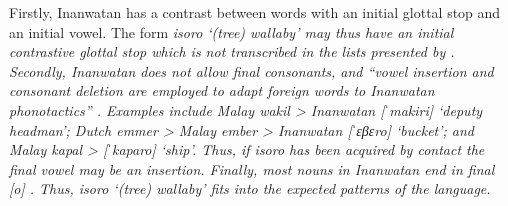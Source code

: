 Firstly, Inanwatan has a contrast between words with an initial
glottal stop and an initial vowel.
The form \it{isoro} ‘(tree) wallaby’ may thus have an initial
contrastive glottal stop which is not transcribed in the lists
presented by \citet[219, 229]{SmitsVoorhoeve1998}.
Secondly, Inanwatan does not allow final consonants,
and “vowel insertion and consonant deletion are employed to adapt
foreign words to Inanwatan phonotactics” \citep[6]{deVries2004}.
Examples include Malay \it{wakil} > Inanwatan [ˈmakiri] ‘deputy
headman’; Dutch \it{emmer} > Malay \it{ember} > Inanwatan [ˈɛβɛro]
‘bucket’; and Malay \it{kapal} > [ˈkaparo] ‘ship’.
Thus, if \it{isoro} has been acquired by contact the final vowel
may be an insertion.
Finally, most nouns in Inanwatan end in final [o] \citep[33]{deVries2004}.
Thus, \it{isoro} ‘(tree) wallaby’ fits into the expected patterns of the language.